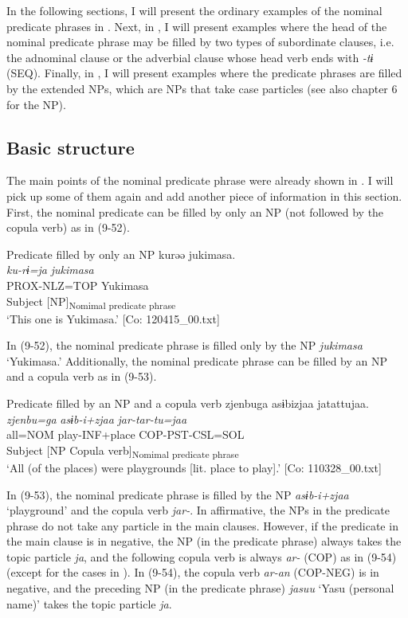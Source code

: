 In the following sections, I will present the ordinary examples of the nominal predicate phrases in . Next, in , I will present examples where the head of the nominal predicate phrase may be filled by two types of subordinate clauses, i.e. the adnominal clause or the adverbial clause whose head verb ends with \textit{{}-tɨ} (SEQ). Finally, in , I will present examples where the predicate phrases are filled by the extended NPs, which are NPs that take case particles (see also chapter 6 for the NP).

\subsection{Basic structure}\label{sec:9.3.1}

The main points of the nominal predicate phrase were already shown in . I will pick up some of them again and add another piece of information in this section. First, the nominal predicate can be filled by only an NP (not followed by the copula verb) as in (9-52).

\ea   Predicate filled by only an NP \label{ex:9.52}
 \gllll  kurəə  jukimasa.\\
    \textit{ku-rɨ=ja}  \textit{jukimasa}\\
    PROX-NLZ=TOP  Yukimasa\\
    Subject  [NP]\textsubscript{Nomimal predicate phrase}\\
    \glt     ‘This one is Yukimasa.’ [Co: 120415\_00.txt]
\z

In (9-52), the nominal predicate phrase is filled only by the NP \textit{jukimasa} ‘Yukimasa.’ Additionally, the nominal predicate phrase can be filled by an NP and a copula verb as in (9-53).

\ea   Predicate filled by an NP and a copula verb \label{ex:9.53}
 \gllll  zjenbuga  asɨbizjaa  jatattujaa.\\
    \textit{zjenbu=ga}  \textit{asɨb-i+zjaa}  \textit{jar{}-tar-tu=jaa}\\
    all=NOM  play-INF+place  COP-PST-CSL=SOL\\
    Subject  [NP  Copula verb]\textsubscript{Nomimal predicate phrase}\\
    \glt     ‘All (of the places) were playgrounds [lit. place to play].’ [Co: 110328\_00.txt]
\z

In (9-53), the nominal predicate phrase is filled by the NP \textit{asɨb-i+zjaa} ‘playground’ and the copula verb \textit{jar-}. In affirmative, the NPs in the predicate phrase do not take any particle in the main clauses. However, if the predicate in the main clause is in negative, the NP (in the predicate phrase) always takes the topic particle \textit{ja}, and the following copula verb is always \textit{ar-} (COP) as in (9-54) (except for the cases in ). In (9-54), the copula verb \textit{ar-an} (COP-NEG) is in negative, and the preceding NP (in the predicate phrase) \textit{jasuu} ‘Yasu (personal name)’ takes the topic particle \textit{ja}.

